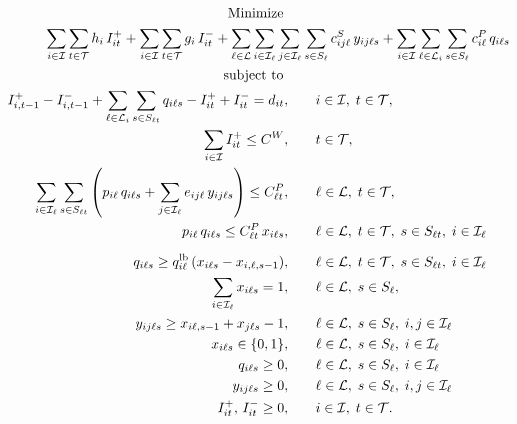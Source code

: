 \documentclass[11pt]{article}
\begin{document}
\begin{align}
\mbox{Minimize }\nonumber\quad & \\
\sum_{i \in {\cal I}} \sum_{t \in {\cal T}} h_i \, I_{it}^+
+ \sum_{i \in {\cal I}} \sum_{t \in {\cal T}} g_i \, I^-_{it} 
+ \sum_{\ell \in {\cal L}} \sum_{i \in {\cal I_{\ell}}} \sum_{j \in {\cal I_{\ell}}}  & \sum_{s \in S_{\ell}} c^S_{i j \ell}\, y_{i j \ell s}
+ \sum_{i \in {\cal I}} \sum_{\ell \in {\cal L}_i} \sum_{s \in S_{\ell}} c^P_{i \ell}\, q_{i\ell s} \label{fo}
\\
\mbox{subject to } \quad & \nonumber
\\
I^+_{i, t- 1} - I^-_{i, t-1} + \sum_{\ell  \in {\cal L}_i} \sum_{s \in S_{\ell t}} q_{i\ell s} - I^+_{it} + I^-_{it} = d_{it}, \quad & 
\quad i \in {\cal I}, \; t \in {\cal T}, \label{eq2}
\\ 
\sum_{i \in {\cal I}} I^+_{it} \leq C^W, \quad & 
\quad t \in {\cal T}, \label{eq3}
\\
\sum_{i \in {\cal I}_{\ell}}  \sum_{s \in S_{\ell t}} \left( p_{i\ell }\, q_{i\ell s} + \sum_{j \in {\cal I}_{\ell}} e_{ij\ell } \, y_{ij\ell s}\right) \leq C^P_{\ell t}, \quad & \quad \ell \in {\cal L}, \; t \in {\cal T}, \label{eq4}
\\
p_{i\ell } \, q_{i\ell s} \leq C^P_{\ell t} \, x_{i\ell s}, \quad & 
\quad \ell \in {\cal L}, \; t \in {\cal T}, \; s \in S_{\ell t}, \; i \in {\cal I}_{\ell} \label{eq5}
\\[2mm]
q_{i\ell s} \geq q^{\mathrm{lb}}_{i\ell }\, (x_{i\ell s} - x_{i,\ell ,s-1}), \quad & 
\quad \ell \in {\cal L}, \; t \in {\cal T}, \; s \in S_{\ell t}, \; i \in {\cal I}_{\ell} \label{eq6}
\\
\sum_{i \in {\cal I}_{\ell }} x_{i\ell s} = 1, \quad & 
\quad \ell \in {\cal L}, \; s \in S_{\ell}, \label{eq7}\\
y_{ij\ell s} \geq x_{i\ell ,s-1} + x_{j\ell s} - 1, \quad & \quad
\ell \in {\cal L}, \; s \in S_{\ell}, \; i,j \in {\cal I}_{\ell} \label{eq8}
\\
x_{i\ell s} \in \{0,1\}, \quad & \quad
\ell \in {\cal L}, \; s \in S_{\ell}, \; i \in {\cal I}_{\ell} \label{eq10}
\\
q_{i\ell s} \geq 0, \quad & \quad
\ell \in {\cal L}, \; s \in S_{\ell}, \; i \in {\cal I}_{\ell} \label{eq11a}
\\
y_{ij\ell s} \geq 0, \quad & \quad
\ell \in {\cal L}, \; s \in S_{\ell}, \; i,j \in {\cal I}_{\ell} \label{eq11b}
\\
I^+_{it}, \, I^-_{it} \geq 0, \quad & \quad
i \in {\cal I}, \; t \in {\cal T}. \label{eq11c}
\end{align}
\end{document}
